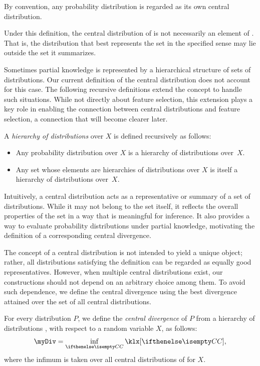 By convention, any probability distribution is regarded as its own central distribution.

Under this definition, the central distribution of \setQ is not necessarily an element of \setQ.
That is, the distribution that best represents the set in the specified sense may lie outside the set it summarizes.

Sometimes partial knowledge is represented by a hierarchical structure of sets of distributions.
Our current definition of the central distribution does not account for this case.
The following recursive definitions extend the concept to handle such situations.
While not directly about feature selection, this extension plays a key role in enabling the connection between
central distributions and feature selection, a connection that will become clearer later.

\begin{definition}
    \label{def:hierarchy-of-distributions}
    A \emph{hierarchy of distributions} over $X$ is defined recursively as follows:
    \begin{itemize}
        \item Any probability distribution over $X$ is a hierarchy of distributions over~$X$.
        \item Any set whose elements are hierarchies of distributions over $X$ is itself a hierarchy of
        distributions over~$X$.
    \end{itemize}
\end{definition}

Intuitively, a central distribution acts as a representative or summary of a set of distributions.
While it may not belong to the set itself, it reflects the overall properties of the set in a way that is
meaningful for inference.
It also provides a way to evaluate probability distributions under partial knowledge, motivating the
definition of a corresponding central divergence.

The concept of a central distribution is not intended to yield a unique object; rather, all distributions satisfying
the definition can be regarded as equally good representatives.
However, when multiple central distributions exist, our constructions should not depend on an arbitrary
choice among them.
To avoid such dependence, we define the central divergence using the best divergence attained over the set of all
central distributions.

\begin{definition}
    \label{def:central-divergence}
    For every distribution $P$, we define the \emph{central divergence} of $P$ from a hierarchy of distributions ,
    with respect to a random variable $X$, as follows:
    \begin{equation*}
        \myDiv = \inf_{\cDist} \klx[{\cDist}],
    \end{equation*}
    where the infimum is taken over all central distributions of  for $X$.
\end{definition}

